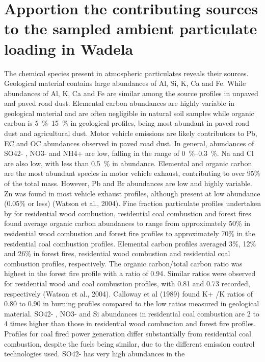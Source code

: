 \documentclass{nwureport}
\begin{document}
\section{Apportion the contributing sources to the sampled ambient particulate loading in Wadela}

The chemical species present in atmospheric particulates reveals their sources. Geological material contains large abundances of Al, Si, K, Ca and Fe. While abundances of Al, K, Ca and Fe are similar among the source profiles in unpaved and paved road dust. Elemental carbon abundances are highly variable in geological material and are often negligible in natural soil samples while organic carbon is \SIrange{5}{15}{\percent} in geological profiles, being most abundant in paved road dust and agricultural dust. Motor vehicle emissions are likely contributors to Pb, EC and OC abundances observed in paved road dust. In general, abundances of SO42- , NO3- and NH4+ are low, falling in the range of \SIrange{0}{0.3}{\percent}. Na and Cl are also low, with less than \SI{0.5}{\percent} in abundance. Elemental and organic carbon are the most abundant species in motor vehicle exhaust, contributing to over 95\% of the total mass. However, Pb and Br abundances are low and highly variable. Zn was found in most vehicle exhaust profiles, although present at low abundance (0.05\% or less) (Watson et
al., 2004). Fine fraction particulate profiles undertaken by \cite{Watson1996} for residential wood
combustion, residential coal combustion and forest fires found average organic carbon abundances to range
from approximately 50\% in residential wood combustion and forest fire profiles to approximately 70\% in the
residential coal combustion profiles. Elemental carbon profiles averaged 3\%, 12\% and 26\% in forest fires,
residential wood combustion and residential coal combustion profiles, respectively. The organic carbon/total
carbon ratio was highest in the forest fire profile with a ratio of 0.94. Similar ratios were observed for
residential wood and coal combustion profiles, with 0.81 and 0.73 recorded, respectively (Watson et al.,
2004). Calloway et al (1989) found K+ /K ratios of 0.80 to 0.90 in burning profiles compared to the low ratios
measured in geological material. SO42- , NO3- and Si abundances in residential coal combustion are \num{2} to \num{4}
times higher than those in residential wood combustion and forest fire profiles.
Profiles for coal fired power generation differ substantially from residential coal combustion, despite the fuels
being similar, due to the different emission control technologies used. SO42- has very high abundances in the
\end{document}
